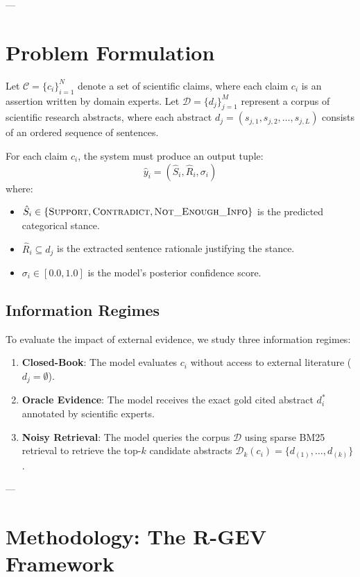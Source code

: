 \documentclass[10pt,journal,compsoc]{IEEEtran}
\begin{document}
---

\section{Problem Formulation}

Let $\mathcal{C} = \{c_i\}_{i=1}^N$ denote a set of scientific claims, where each claim $c_i$ is an assertion written by domain experts. Let $\mathcal{D} = \{d_j\}_{j=1}^M$ represent a corpus of scientific research abstracts, where each abstract $d_j = (s_{j,1}, s_{j,2}, \dots, s_{j,L})$ consists of an ordered sequence of sentences.

For each claim $c_i$, the system must produce an output tuple:
\begin{equation}
    \hat{y}_i = (\hat{S}_i, \hat{R}_i, \sigma_i)
\end{equation}
where:
\begin{itemize}
    \item $\hat{S}_i \in \{\textsc{Support}, \textsc{Contradict}, \textsc{Not\_Enough\_Info}\}$ is the predicted categorical stance.
    \item $\hat{R}_i \subseteq d_j$ is the extracted sentence rationale justifying the stance.
    \item $\sigma_i \in [0.0, 1.0]$ is the model's posterior confidence score.
\end{itemize}

\subsection{Information Regimes}
To evaluate the impact of external evidence, we study three information regimes:
\begin{enumerate}
    \item \textbf{Closed-Book}: The model evaluates $c_i$ without access to external literature ($d_j = \emptyset$).
    \item \textbf{Oracle Evidence}: The model receives the exact gold cited abstract $d_i^*$ annotated by scientific experts.
    \item \textbf{Noisy Retrieval}: The model queries the corpus $\mathcal{D}$ using sparse BM25 retrieval to retrieve the top-$k$ candidate abstracts $\mathcal{D}_k(c_i) = \{d_{(1)}, \dots, d_{(k)}\}$.
\end{enumerate}

---

\section{Methodology: The R-GEV Framework}
\end{document}
